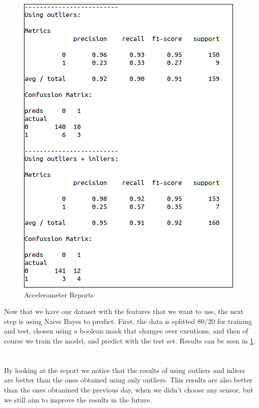\documentclass[idxtotoc,hyperref,openany]{labbook} %
\begin{document}
\begin{figure}[h]
\includegraphics[width=0.9\linewidth]{Milestone3/report_accelerometer.png}
\setlength\belowcaptionskip{-10pt}
\caption{Accelerometer Reports}
\label{Accelerometer Report}
\end{figure}

Now that we have our dataset with the features that we want to use, the next step is using Naive Bayes to predict. First, the data is splitted 80/20 for training and test, chosen using a boolean mask that changes over exeutions, and then of course we train the model, and predict with the test set. Results can be seen in \ref{Accelerometer Report}.\\\\\\

By looking at the report we notice that the results of using outliers and inliers are better than the ones obtained using only outliers. This results are also better than the ones obtanined the previous day, when we didn't choose any sensor, but we still aim to improve the results in the future.
\end{document}
